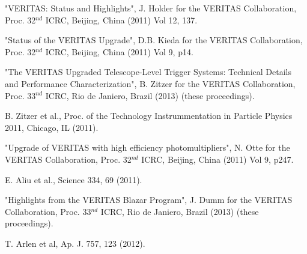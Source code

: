 \documentclass[a4paper]{article}
\begin{document}
\begin{thebibliography}{}
 "VERITAS: Status and Highlights", J. Holder for the VERITAS Collaboration,  Proc. 32$^{nd}$ ICRC, Beijing, China (2011) Vol 12, 137. 

 "Status of the VERITAS Upgrade", D.B. Kieda for the VERITAS Collaboration,  Proc. 32$^{nd}$ ICRC, Beijing, China (2011) Vol 9, p14.

 "The VERITAS Upgraded Telescope-Level Trigger Systems: Technical Details and Performance Characterization", B. Zitzer for the VERITAS Collaboration,  Proc. 33$^{nd}$ ICRC, Rio de Janiero, Brazil (2013) (these proceedings).

 B. Zitzer et al., Proc. of the Technology Instrummentation in Particle Physics 2011, Chicago, IL (2011).

 "Upgrade of VERITAS with high efficiency photomultipliers", N. Otte for the VERITAS Collaboration,  Proc. 32$^{nd}$ ICRC, Beijing, China (2011) Vol 9, p247.

 E. Aliu et al., Science 334, 69 (2011).

 "Highlights from the VERITAS Blazar Program", J. Dumm for the VERITAS Collaboration,  Proc. 33$^{nd}$ ICRC, Rio de Janiero, Brazil (2013) (these proceedings).

 T. Arlen et al, Ap. J. 757, 123 (2012).


\end{thebibliography}


 
\end{document}
